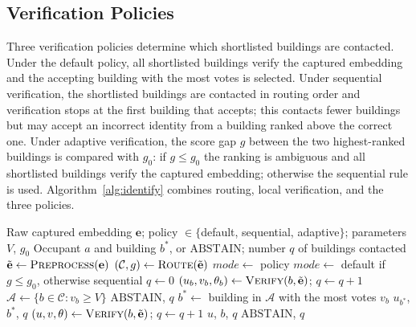 \documentclass[pdflatex,sn-mathphys-num]{sn-jnl}%
\theoremstyle{thmstyleone}%
\theoremstyle{thmstyletwo}%
\theoremstyle{thmstylethree}%
\begin{document}
\subsection{Verification Policies}
\label{subsec:verification_policies}

Three verification policies determine which shortlisted buildings are contacted. Under the default policy, all shortlisted buildings verify the captured embedding and the accepting building with the most votes is selected. Under sequential verification, the shortlisted buildings are contacted in routing order and verification stops at the first building that accepts; this contacts fewer buildings but may accept an incorrect identity from a building ranked above the correct one. Under adaptive verification, the score gap $g$ between the two highest-ranked buildings is compared with $g_0$: if $g\le g_0$ the ranking is ambiguous and all shortlisted buildings verify the captured embedding; otherwise the sequential rule is used. Algorithm~\ref{alg:identify} combines routing, local verification, and the three policies.

\begin{algorithm}[!t]
\footnotesize
\caption{Identification with a verification policy}
\label{alg:identify}
\begin{algorithmic}[1]
\Require Raw captured embedding $\mathbf{e}$; policy $\in\{$default, sequential, adaptive$\}$; parameters $V$, $g_0$
\Ensure Occupant $a$ and building $b^*$, or $\mathrm{ABSTAIN}$; number $q$ of buildings contacted
\State $\tilde{\mathbf{e}}\gets\textsc{Preprocess}(\mathbf{e})$ 
\State $(\mathcal{C},g)\gets\textsc{Route}(\tilde{\mathbf{e}})$ 
\State $\mathit{mode}\gets$ policy
  \State $\mathit{mode}\gets$ default if $g\leq g_0$, otherwise sequential 
\EndIf
\State $q\gets0$
 
    \State $(u_b,v_b,\theta_b)\gets\textsc{Verify}(b,\tilde{\mathbf{e}})$; $q\gets q+1$
  \EndFor
  \State $\mathcal{A}\gets\{b\in\mathcal{C}:v_b\geq V\}$ 
    \State \Return $\mathrm{ABSTAIN}$, $q$
  \EndIf
  \State $b^*\gets$ building in $\mathcal{A}$ with the most votes $v_b$ 
  \State \Return $u_{b^*}$, $b^*$, $q$
\Else {}
    \State $(u,v,\theta)\gets\textsc{Verify}(b,\tilde{\mathbf{e}})$; $q\gets q+1$
      \State \Return $u$, $b$, $q$
    \EndIf
  \EndFor
  \State \Return $\mathrm{ABSTAIN}$, $q$
\EndIf
\end{algorithmic}
\end{algorithm}
\end{document}
